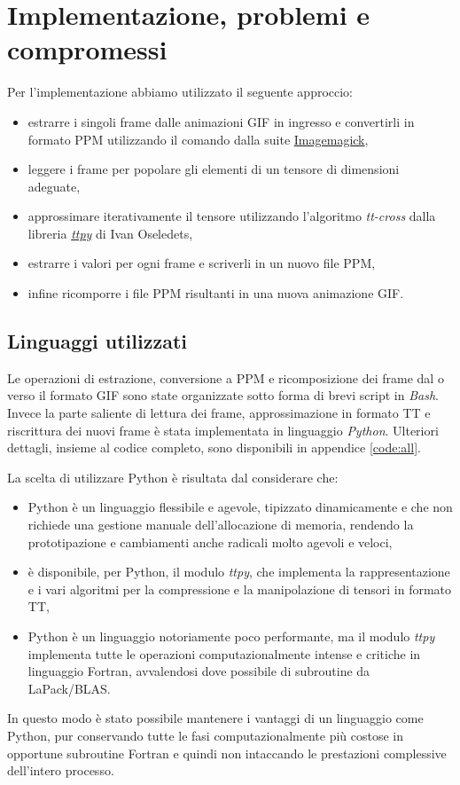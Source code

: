 \documentclass[11pt,a4paper]{article}
\begin{document}
\section{Implementazione, problemi e compromessi}
Per l'implementazione abbiamo utilizzato il seguente approccio:
\begin{itemize}
\item estrarre i singoli frame dalle animazioni GIF in ingresso e convertirli in formato PPM utilizzando il comando  dalla suite \href{http://www.imagemagick.org/}{Imagemagick},
\item leggere i frame per popolare gli elementi di un tensore di dimensioni adeguate,
\item approssimare iterativamente il tensore utilizzando l'algoritmo \emph{tt-cross} dalla libreria \href{https://github.com/oseledets/ttpy}{\emph{ttpy}} di Ivan Oseledets,
\item estrarre i valori per ogni frame e scriverli in un nuovo file PPM,
\item infine ricomporre i file PPM risultanti in una nuova animazione GIF.
\end{itemize}

\subsection{Linguaggi utilizzati}
Le operazioni di estrazione, conversione a PPM e ricomposizione dei frame dal o verso il formato GIF sono state organizzate sotto forma di brevi script in \emph{Bash}. Invece la parte saliente di lettura dei frame, approssimazione in formato TT e riscrittura dei nuovi frame è stata implementata in linguaggio \emph{Python}. Ulteriori dettagli, insieme al codice completo, sono disponibili in appendice \ref{code:all}.

La scelta di utilizzare Python è risultata dal considerare che:
\begin{itemize}
\item Python è un linguaggio flessibile e agevole, tipizzato dinamicamente e che non richiede una gestione manuale dell'allocazione di memoria, rendendo la prototipazione e cambiamenti anche radicali molto agevoli e veloci,
\item è disponibile, per Python, il modulo \emph{ttpy}, che implementa la rappresentazione e i vari algoritmi per la compressione e la manipolazione di tensori in formato TT,
\item Python è un linguaggio notoriamente poco performante, ma il modulo \emph{ttpy} implementa tutte le operazioni computazionalmente intense e critiche in linguaggio Fortran, avvalendosi dove possibile di subroutine da LaPack/BLAS.
\end{itemize}
In questo modo è stato possibile mantenere i vantaggi di un linguaggio come Python, pur conservando tutte le fasi computazionalmente più costose in opportune subroutine Fortran e quindi non intaccando le prestazioni complessive dell'intero processo.
\end{document}
